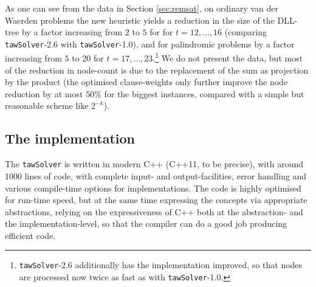 \documentclass[final,3p,times]{elsarticle}
\theoremstyle{definition}
\newcommand{\tawsolver}{\texttt{tawSolver}}
\newcommand{\otawsolver}{\tawsolver-1.0}
\newcommand{\ntawsolver}{\tawsolver-2.6}
\begin{document}
As one can see from the data in Section \ref{sec:remsat}, on ordinary van der Waerden problems the new heuristic yields a reduction in the size of the DLL-tree by a factor increasing from $2$ to $5$ for for $t = 12, \dots, 16$ (comparing \ntawsolver{} with \otawsolver), and for palindromic problems by a factor increasing from $5$ to $20$ for $t = 17, \dots, 23$.\footnote{\ntawsolver{} additionally has the implementation improved, so that nodes are processed now twice as fast as with \otawsolver.} We do not present the data, but most of the reduction in node-count is due to the replacement of the sum as projection by the product (the optimised clause-weights only further improve the node reduction by at most $50\%$ for the biggest instances, compared with a simple but reasonable scheme like $2^{-k}$).



\subsection{The implementation}
\label{sec:tawsolverimpl}

The \tawsolver{} is written in modern C++ (C++11, to be precise), with around 1000 lines of code, with complete input- and output-facilities, error handling and various compile-time options for implementations. The code is highly optimised for run-time speed, but at the same time expressing the concepts via appropriate abstractions, relying on the expressiveness of C++ both at the abstraction- and the implementation-level, so that the compiler can do a good job producing efficient code.
\end{document}
